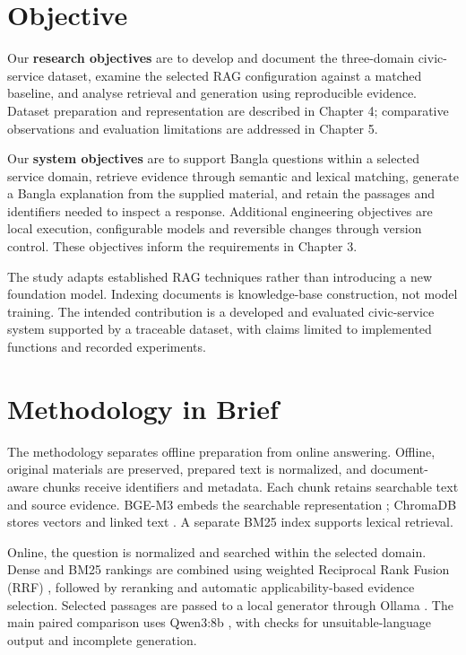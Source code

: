\section{Objective}
Our \textbf{research objectives} are to develop and document the three-domain civic-service dataset, examine the selected RAG configuration against a matched baseline, and analyse retrieval and generation using reproducible evidence. Dataset preparation and representation are described in Chapter 4; comparative observations and evaluation limitations are addressed in Chapter 5.

Our \textbf{system objectives} are to support Bangla questions within a selected service domain, retrieve evidence through semantic and lexical matching, generate a Bangla explanation from the supplied material, and retain the passages and identifiers needed to inspect a response. Additional engineering objectives are local execution, configurable models and reversible changes through version control. These objectives inform the requirements in Chapter 3.

The study adapts established RAG techniques rather than introducing a new foundation model. Indexing documents is knowledge-base construction, not model training. The intended contribution is a developed and evaluated civic-service system supported by a traceable dataset, with claims limited to implemented functions and recorded experiments.

\section{Methodology in Brief }
The methodology separates offline preparation from online answering. Offline, original materials are preserved, prepared text is normalized, and document-aware chunks receive identifiers and metadata. Each chunk retains searchable text and source evidence. BGE-M3 embeds the searchable representation \cite{bgem3}; ChromaDB stores vectors and linked text \cite{chroma_docs}. A separate BM25 index supports lexical retrieval.

Online, the question is normalized and searched within the selected domain. Dense and BM25 rankings are combined using weighted Reciprocal Rank Fusion (RRF) \cite{rrf}, followed by reranking and automatic applicability-based evidence selection. Selected passages are passed to a local generator through Ollama \cite{ollama_docs}. The main paired comparison uses Qwen3:8b \cite{qwen3}, with checks for unsuitable-language output and incomplete generation.

